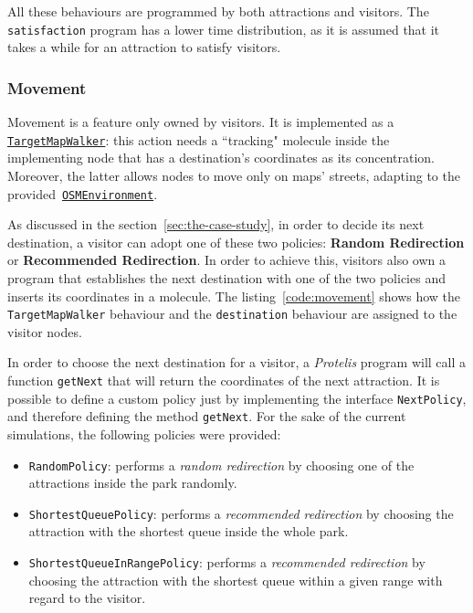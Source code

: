 \noindent
All these behaviours are programmed by both attractions and visitors.
The \texttt{satisfaction} program has a lower time distribution, as it is assumed that it takes a while for an attraction to satisfy visitors.

\subsubsection{Movement}
Movement is a feature only owned by visitors.
It is implemented as a \href{https://alchemistsimulator.github.io/reference/kdoc/alchemist/it.unibo.alchemist.model.implementations.actions/-target-map-walker/index.html}{\texttt{TargetMapWalker}}: this action needs a ``tracking" molecule inside the implementing node that has a destination's coordinates as its concentration.
Moreover, the latter allows nodes to move only on maps' streets, adapting to the provided~\href{https://alchemistsimulator.github.io/reference/kdoc/alchemist/it.unibo.alchemist.model.implementations.environments/-o-s-m-environment/}{\texttt{OSMEnvironment}}.

As discussed in the section~\ref{sec:the-case-study}, in order to decide its next destination, a visitor can adopt one of these two policies: \textbf{Random Redirection} or \textbf{Recommended Redirection}.
In order to achieve this, visitors also own a program that establishes the next destination with one of the two policies and inserts its coordinates in a molecule.
The listing~\ref{code:movement} shows how the \texttt{TargetMapWalker} behaviour and the \texttt{destination} behaviour are assigned to the visitor nodes.



In order to choose the next destination for a visitor, a \textit{Protelis} program will call a function \texttt{getNext} that will return the coordinates of the next attraction.
It is possible to define a custom policy just by implementing the interface \texttt{NextPolicy}, and therefore defining the method \texttt{getNext}.
For the sake of the current simulations, the following policies were provided:
\begin{itemize}
    \item \texttt{RandomPolicy}: performs a \textit{random redirection} by choosing one of the attractions inside the park randomly.
    \item \texttt{ShortestQueuePolicy}: performs a \textit{recommended redirection} by choosing the attraction with the shortest queue inside the whole park.
    \item \texttt{ShortestQueueInRangePolicy}: performs a \textit{recommended redirection} by choosing the attraction with the shortest queue within a given range with regard to the visitor.
\end{itemize}

